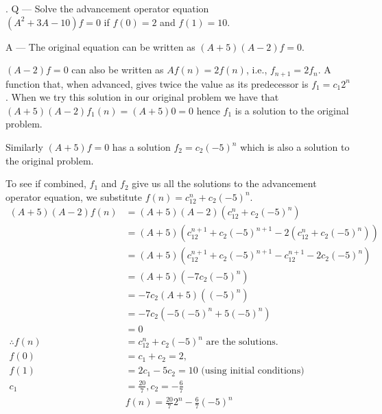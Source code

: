 \documentclass{article}
\newcounter{question}
\begin{document}
\newcommand\Que[1]{%
   \leavevmode\par
   \stepcounter{question}
   \noindent
   \thequestion. Q --- #1\par}

\newcommand\Ans[2][]{%
    \leavevmode\par\noindent
   {\leftskip37pt
    A --- \textbf{#1}#2\par}}

\Que{
    Solve the advancement operator equation\\
    $(A^2+3 A-10)f=0$ if $f(0)=2$
    and $f(1)=10$.
}
\Ans{
    The original equation can be written as $(A+5)(A-2)f=0$.

    $(A-2)f=0$ can also be written as $Af(n) = 2f(n)$, i.e.,
    $f_{n+1}=2f_n$. A function that, when advanced,
    gives twice the value as its predecessor is $f_1=c_1{2^n}$.
    When we try this solution in our original problem we have that
    $(A+5)(A-2)f_1(n) = (A+5)0 = 0$ hence $f_1$ is a solution
    to the original problem.

    Similarly $(A+5)f=0$ has a solution
    $f_2=c_2(-5)^n$ which is also a solution
    to the original problem.

    To see if combined, $f_1$ and $f_2$ give us
    all the solutions to the advancement operator
    equation, we substitute $f(n) = c_12^n + c_2(-5)^n$.
    \begin{align*}
        (A+5)(A-2)f(n) &= (A+5)(A-2)(c_12^n + c_2(-5)^n)\\
        & = (A+5)(
            c_12^{n+1} + c_2(-5)^{n+1}
            - 2(c_12^n + c_2(-5)^n)
            )\\
        & = (A+5)(
            c_12^{n+1} + c_2(-5)^{n+1}
            - c_12^{n+1} - 2c_2(-5)^n
            )\\
        & = (A+5)(
            -7c_2(-5)^n
            )\\
        & = -7c_2(A+5)((-5)^n)\\
        & = -7c_2(-5(-5)^{n} + 5(-5)^{n})\\
        & = 0\\
        \therefore
        f(n) & = c_12^n + c_2(-5)^n \text{ are the solutions.}\\        
        f(0) & = c_1 + c_2 = 2,\\
        f(1) & = 2c_1 - 5c_2 = 10
        \text{ (using initial conditions)}\\
        c_1 & = \frac{20}{7}, c_2 = -\frac{6}{7}\\
        & \boxed{f(n) = \frac{20}{7}2^n - \frac{6}{7}(-5)^n}
    \end{align*}

}
\end{document}
